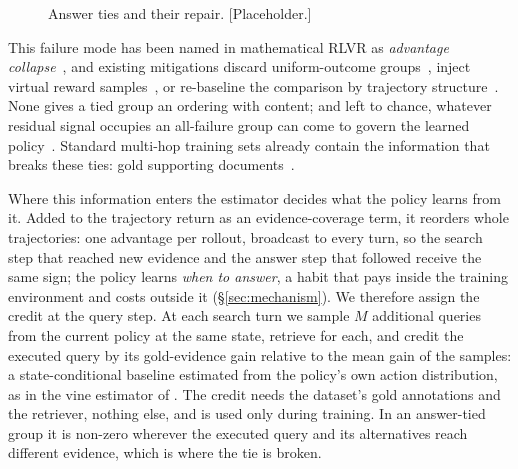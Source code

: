 \begin{figure}[t]
\centering
{}
\caption{Answer ties and their repair. [Placeholder.]}
\label{fig:teaser}
\end{figure}

  This failure mode has been named in mathematical RLVR as
  \emph{advantage collapse}~\citep{he2026collapse}, and existing
  mitigations discard uniform-outcome
  groups~\citep{yu2025dapo,greso2025,xu2026downsampling}, inject virtual
  reward samples~\citep{he2026collapse}, or re-baseline the comparison
  by trajectory structure~\citep{zhu2025grpo,Ji2026tree}. None gives a
  tied group an ordering with content; and left to chance, whatever
  residual signal occupies an all-failure group can come to govern the
  learned policy~\citep{wang2026darkroom}. Standard multi-hop training
  sets already contain the information that breaks these ties: gold
  supporting documents~\citep{trived2022musique,yang2018hotpotqa}.

  Where this information enters the estimator decides what the policy
  learns from it. Added to the trajectory return as an evidence-coverage
  term, it reorders whole trajectories: one advantage per rollout,
  broadcast to every turn, so the search step that reached new evidence
  and the answer step that followed receive the same sign; the policy
  learns \emph{when to answer}, a habit that pays inside the training
  environment and costs outside it (\S\ref{sec:mechanism}). We therefore
  assign the credit at the query step. At each search turn we sample $M$
  additional queries from the current policy at the same state, retrieve
  for each, and credit the executed query by its gold-evidence gain
  relative to the mean gain of the samples: a state-conditional baseline
  estimated from the policy's own action distribution, as in the vine
  estimator of \citet{schulman2015trpo}. The credit needs the dataset's
  gold annotations and the retriever, nothing else, and is used only
  during training. In an answer-tied group it is non-zero wherever the
  executed query and its alternatives reach different evidence, which is
  where the tie is broken.

